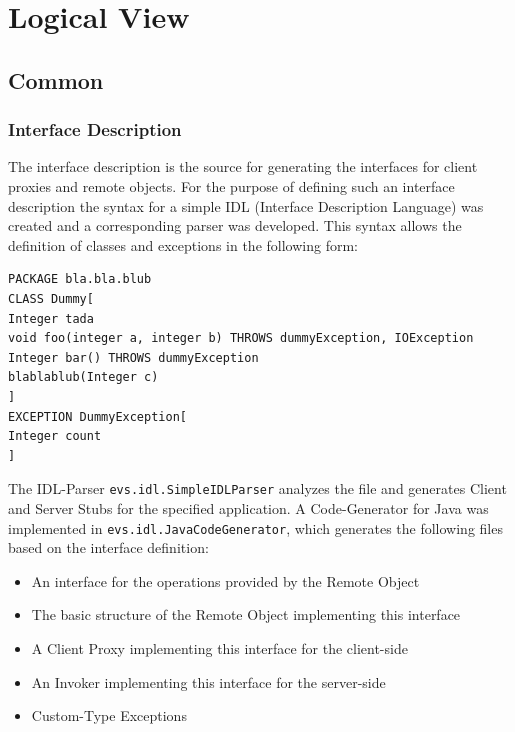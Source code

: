\section{Logical View}

\subsection{Common}

\subsubsection{Interface Description}
The interface description is the source for generating the interfaces for client proxies and remote objects. For the purpose of defining such an interface description the syntax for a simple IDL (Interface Description Language) was created and a corresponding parser was developed. This syntax allows the definition of classes and exceptions in the following form:

\begin{code}
\begin{small}
\begin{verbatim}
PACKAGE bla.bla.blub
CLASS Dummy[
Integer tada
void foo(integer a, integer b) THROWS dummyException, IOException
Integer bar() THROWS dummyException
blablablub(Integer c)
]
EXCEPTION DummyException[
Integer count
]
\end{verbatim}
\end{small}
\end{code}


The IDL-Parser \texttt{evs.idl.SimpleIDLParser} analyzes the file and generates Client and Server Stubs for the specified application. A Code-Generator for Java was implemented in \texttt{evs.idl.JavaCodeGenerator}, which generates the following files based on the interface definition:

\begin{itemize}\itemsep0pt
\item An interface for the operations provided by the Remote Object
\item The basic structure of the Remote Object implementing this interface
\item A Client Proxy implementing this interface for the client-side
\item An Invoker implementing this interface for the server-side
\item Custom-Type Exceptions
\end{itemize}

